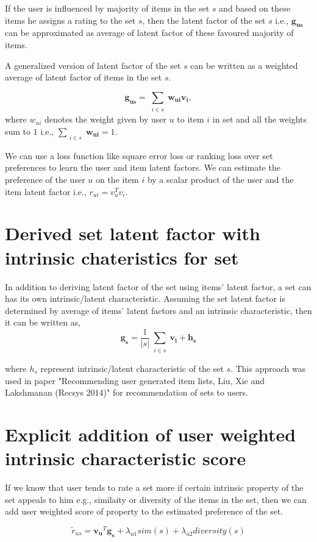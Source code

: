 \documentclass[11pt]{article}
\begin{document}
If the user is influenced by majority of items in the set $s$ and based on these
items he assigns a rating to the set $s$, then the latent factor of the set $s$
i.e., $\bm{g_{us}}$ can be approximated as average of latent factor of these
favoured majority of items.

A generalized version of latent factor of the set $s$ can be written as
a weighted average of latent factor of items in the set $s$.

\begin{equation}
  \bm{g_{us}} = \sum_{\substack{i \in s}}\bm{w_{ui}}\bm{v_i}, 
\end{equation}
where $w_{ui}$ denotes the weight given by user $u$ to item $i$ in set and all
the weights sum to $1$ i.e., $\sum_{\substack{i \in s}} \bm{w_{ui}} = 1$.

We can use a loss function like square error loss  or ranking loss over set
preferences to learn the user and item latent factors. We can estimate the
preference of the user $u$ on the item $i$ by a scalar product of the user and the
item latent factor i.e., $r_{ui} = v_u^T v_i$.

\section{Derived set latent factor with intrinsic chateristics for set}
In addition to deriving latent factor of the set using items' latent factor, a
set can has its own intrinsic/latent characteristic. Assuming the set latent factor is
determined by average of items' latent factors and an intrinsic characteristic,
then it can be written as,
\begin{equation}
  \bm{g_s} = \frac{1}{|s|}\sum_{\substack{i \in s}}\bm{v_i} + \bm{h_s} 
\end{equation}

where $h_s$ represent intrinsic/latent characteristic of the set $s$. This approach was used
in paper "Recommending user generated item lists, Liu, Xie and Lakshmanan
(Recsys 2014)" for recommendation of sets to users.


\section{Explicit addition of user weighted intrinsic characteristic score}
If we know that user tends to rate a set more if certain intrinsic property of
the set appeals to him e.g., similaity or diversity of the items in the set, then we can add
user weighted score of property to the estimated preference of the set. 

\begin{equation}
  \tilde{r}_{us}  = \bm{v_u}^T\bm{g_s} + \lambda_{u1}sim(s) +
  \lambda_{u2}diversity(s)
\end{equation}
\end{document}
